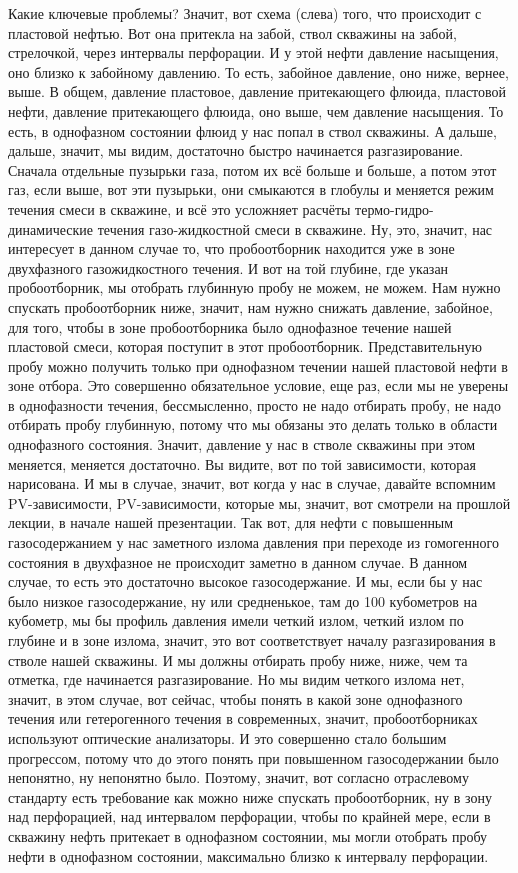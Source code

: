 \documentclass[main.tex]{subfiles}
\begin{document}
Какие ключевые проблемы?
Значит, вот схема (слева) того, что происходит с пластовой нефтью.
Вот она притекла на забой, ствол скважины на забой, стрелочкой, через интервалы перфорации.
И у этой нефти давление насыщения, оно близко к забойному давлению.
То есть, забойное давление, оно ниже, вернее, выше.
В общем, давление пластовое, давление притекающего флюида, пластовой нефти, давление притекающего флюида, оно выше, чем давление насыщения.
То есть, в однофазном состоянии флюид у нас попал в ствол скважины.
А дальше, дальше, значит, мы видим, достаточно быстро начинается разгазирование.
Сначала отдельные пузырьки газа, потом их всё больше и больше, а потом этот газ, если выше, вот эти пузырьки, они смыкаются в глобулы и меняется режим течения смеси в скважине, и всё это усложняет расчёты термо-гидро-динамические течения газо-жидкостной смеси в скважине.
Ну, это, значит, нас интересует в данном случае то, что пробоотборник находится уже в зоне двухфазного газожидкостного течения.
И вот на той глубине, где указан пробоотборник, мы отобрать глубинную пробу не можем, не можем.
Нам нужно спускать пробоотборник ниже, значит, нам нужно снижать давление, забойное, для того, чтобы в зоне пробоотборника было однофазное течение нашей пластовой смеси, которая поступит в этот пробоотборник.
Представительную пробу можно получить только при однофазном течении нашей пластовой нефти в зоне отбора.
Это совершенно обязательное условие, еще раз, если мы не уверены в однофазности течения, бессмысленно, просто не надо отбирать пробу, не надо отбирать пробу глубинную, потому что мы обязаны это делать только в области однофазного состояния.
Значит, давление у нас в стволе скважины при этом меняется, меняется достаточно.
Вы видите, вот по той зависимости, которая нарисована.
И мы в случае, значит, вот когда у нас в случае, давайте вспомним PV-зависимости, PV-зависимости, которые мы, значит, вот смотрели на прошлой лекции, в начале нашей презентации.
Так вот, для нефти с повышенным газосодержанием у нас заметного излома давления при переходе из гомогенного состояния в двухфазное не происходит заметно в данном случае.
В данном случае, то есть это достаточно высокое газосодержание.
И мы, если бы у нас было низкое газосодержание, ну или средненькое, там до 100 кубометров на кубометр, мы бы профиль давления имели четкий излом, четкий излом по глубине и в зоне излома, значит, это вот соответствует началу разгазирования в стволе нашей скважины.
И мы должны отбирать пробу ниже, ниже, чем та отметка, где начинается разгазирование.
Но мы видим четкого излома нет, значит, в этом случае, вот сейчас, чтобы понять в какой зоне однофазного течения или гетерогенного течения в современных, значит, пробоотборниках используют оптические анализаторы.
И это совершенно стало большим прогрессом, потому что до этого понять при повышенном газосодержании было непонятно, ну непонятно было.
Поэтому, значит, вот согласно отраслевому стандарту есть требование как можно ниже спускать пробоотборник, ну в зону над перфорацией, над интервалом перфорации, чтобы по крайней мере, если в скважину нефть притекает в однофазном состоянии, мы могли отобрать пробу нефти в однофазном состоянии, максимально близко к интервалу перфорации.
\end{document}
